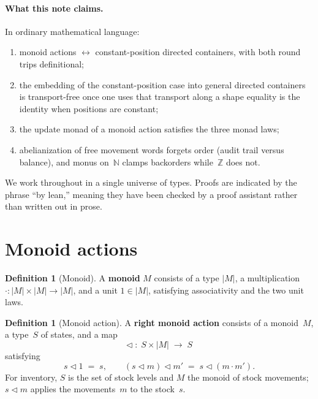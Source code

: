 \documentclass[11pt,a4paper]{article}
\theoremstyle{plain}
\theoremstyle{definition}
\newtheorem{definition}[theorem]{Definition}
\begin{document}
\paragraph{What this note claims.}
In ordinary mathematical language:
\begin{enumerate}
  \item monoid actions $\longleftrightarrow$ constant-position directed
        containers, with both round trips definitional;
  \item the embedding of the constant-position case into general directed
        containers is transport-free once one uses that transport along a
        shape equality is the identity when positions are constant;
  \item the update monad of a monoid action satisfies the three monad
        laws;
  \item abelianization of free movement words forgets order (audit trail
        versus balance), and monus on~$\mathbb{N}$ clamps backorders
        while~$\mathbb{Z}$ does not.
\end{enumerate}

We work throughout in a single universe of types. Proofs are indicated by
the phrase ``by lean,'' meaning they have been checked by a proof
assistant rather than written out in prose.

\section{Monoid actions}

\begin{definition}[Monoid]\label{def:monoid}
A \textbf{monoid} $M$ consists of a type $|M|$, a multiplication
$\cdot : |M| \times |M| \to |M|$, and a unit $1 \in |M|$, satisfying
associativity and the two unit laws.
\end{definition}

\begin{definition}[Monoid action]\label{def:action}
A \textbf{right monoid action} consists of a monoid~$M$, a type~$S$ of
states, and a map
\[
  \mathbin{\triangleleft} \;:\; S \times |M| \;\longrightarrow\; S
\]
satisfying
\begin{equation}
  s \mathbin{\triangleleft} 1 \;=\; s,
  \qquad
  (s \mathbin{\triangleleft} m) \mathbin{\triangleleft} m'
  \;=\;
  s \mathbin{\triangleleft} (m \cdot m').
\end{equation}
For inventory, $S$ is the set of stock levels and $M$ the monoid of stock
movements; $s \mathbin{\triangleleft} m$ applies the movements~$m$ to the
stock~$s$.
\end{definition}
\end{document}
